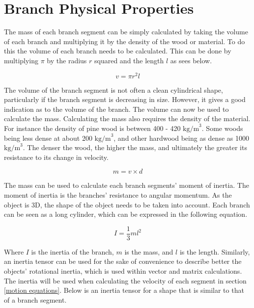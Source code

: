 \section{Branch Physical Properties}

The mass of each branch segment can be simply calculated by taking the volume of each branch and multiplying it by the density of the wood or material. To do this the volume of each branch needs to be calculated. This can be done by multiplying $\pi$ by the radius $r$ squared and the length $l$ as sees below.

\begin{equation}
v  = \pi r^2 l
\end{equation}

\noindent
The volume of the branch segment is not often a clean cylindrical shape, particularly if the branch segment is decreasing in size. However, it gives a good indication as to the volume of the branch. The volume can now be used to calculate the mass. Calculating the mass also requires the density of the material. For instance the density of pine wood is between 400 - 420 $\text{kg/m}^3$. Some woods being less dense at about 200 $\text{kg/m}^3$, and other hardwood being as dense as 1000$\text{kg/m}^3$. The denser the wood, the higher the mass, and ultimately the greater its resistance to its change in velocity.

\begin{equation}
m = v \times d
\end{equation}

\noindent
The mass can be used to calculate each branch segments' moment of inertia. The moment of inertia is the branches' resistance to angular momentum. As the object is 3D, the shape of the object needs to be taken into account. Each branch can be seen as a long cylinder, which can be expressed in the following equation.

\begin{equation}
I = \frac{1}{3} m l ^ 2
\end{equation}

\noindent
Where $I$ is the inertia of the branch, $m$ is the mass, and $l$ is the length. Similarly, an inertia tensor can be used for the sake of convenience to describe better the objects' rotational inertia, which is used within vector and matrix calculations. The inertia will be used when calculating the velocity of each segment in section \ref{motion equations}. Below is an inertia tensor for a shape that is similar to that of a branch segment.


